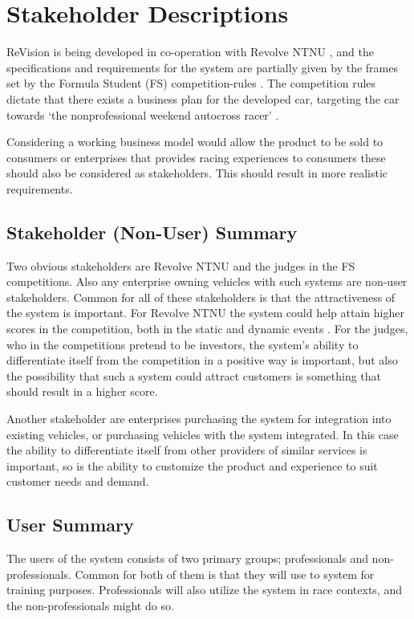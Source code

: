 
\section{Stakeholder Descriptions}

ReVision is being developed in co-operation with Revolve NTNU
 \cite{kranebae:fordypning}, and the specifications and requirements for the
system are partially given by the frames set by the Formula Student (FS) 
competition-rules \cite{FS:challenge,FSG:disciplines,fsae:2014rules}.
The competition rules dictate that there exists a business plan for the
developed car, targeting the car towards `the nonprofessional weekend autocross racer'
 \cite{FSG:disciplines}. 

Considering a working business model would allow the product to
be sold to consumers or enterprises that provides racing experiences to
consumers these should also be considered as stakeholders. This should result
in more realistic requirements.

\subsection{Stakeholder (Non-User) Summary}

Two obvious stakeholders are Revolve NTNU and the judges in the FS
competitions. Also any enterprise owning vehicles with such systems are
non-user stakeholders. Common for all of these stakeholders is that the
attractiveness of the system is important. For Revolve NTNU the system could
help attain higher scores in the competition, both in the static and dynamic
events \cite{FSG:disciplines}. For the judges, who in the competitions
pretend to be investors, the system's ability to differentiate itself from the
competition in a positive way is important, but also the possibility that such a system could
attract customers is something that should result in a higher score.

Another stakeholder are enterprises purchasing the system for integration into existing vehicles,
or purchasing vehicles with the system integrated. In this case the ability to
differentiate itself from other providers of similar services is important, so
is the ability to customize the product and experience to suit customer needs
and demand.

\subsection{User Summary}
The users of the system consists of two primary groups; professionals and
non-professionals. Common for both of them is that they will use to system for
training purposes. Professionals will also utilize the system in race contexts,
and the non-professionals might do so.

